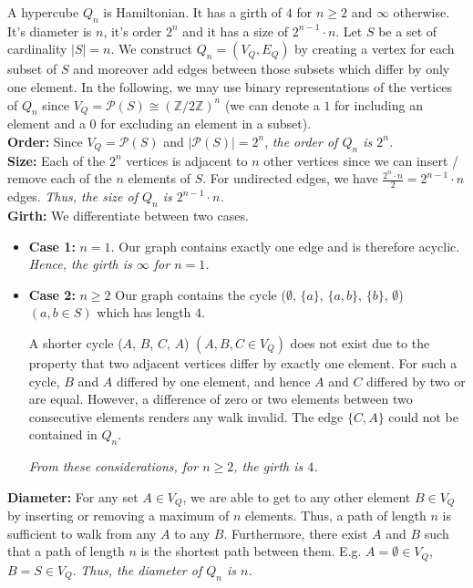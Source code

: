 \documentclass[a4paper]{article}
\begin{document}
	\begin{solution}{9}
		\begin{theorem}{A hypercube $Q_n$ is Hamiltonian. It has a girth of $4$ for $n \geq 2$ and $\infty$ otherwise. It's diameter is $n$, it's order $2^n$ and it has a size of $2^{n-1} \cdot n$.}
			Let $S$ be a set of cardinality $|S| = n$. We construct $Q_n = (V_Q, E_Q)$ by creating a vertex for each subset of $S$ and moreover add edges between those subsets which differ by only one element. In the following, we may use binary representations of the vertices of $Q_n$ since $V_Q = \mathcal{P}(S) \cong (\mathbb{Z}/2\mathbb{Z})^n$ (we can denote a $1$ for including an element and a $0$ for excluding an element in a subset).\\

			\textbf{Order:} Since $V_Q = \mathcal{P}(S)$ and $|\mathcal{P}(S)| = 2^n$, \emph{the order of $Q_n$ is $2^n$.}\\

			\textbf{Size:} Each of the $2^n$ vertices is adjacent to $n$ other vertices since we can insert / remove each of the $n$ elements of $S$. For undirected edges, we have $\frac{2^n \cdot n}{2} = 2^{n-1} \cdot n$ edges. \emph{Thus, the size of $Q_n$ is $2^{n-1} \cdot n$.}\\

			\textbf{Girth:} We differentiate between two cases.
				\begin{itemize}
					\item \textbf{Case 1: } $n=1$. Our graph contains exactly one edge and is therefore acyclic. \emph{Hence, the girth is $\infty$ for $n=1$.}

					\item \textbf{Case 2: } $n\geq2$ Our graph contains the cycle ($\emptyset$, $\{a\}$, $\{a,b\}$, $\{b\}$, $\emptyset$) $(a,b \in S)$ which has length $4$.

						A shorter cycle ($A$, $B$, $C$, $A$) $(A, B, C \in V_Q)$ does not exist due to the property that two adjacent vertices differ by exactly one element. For such a cycle, $B$ and $A$ differed by one element, and hence $A$ and $C$ differed by two or are equal. However, a difference of zero or two elements between two consecutive elements renders any walk invalid. The edge $\{C, A\}$ could not be contained in $Q_n$.
 
						\emph{From these considerations, for $n \geq 2$, the girth is $4$.}
				\end{itemize}

			\textbf{Diameter:}
				For any set $A \in V_Q$, we are able to get to any other element $B \in V_Q$ by inserting or removing a maximum of $n$ elements. Thus, a path of length $n$ is sufficient to walk from any $A$ to any $B$. Furthermore, there exist $A$ and $B$ such that a path of length $n$ is the shortest path between them. E.g. $A = \emptyset \in V_Q$, $B = S \in V_Q$. \emph{Thus, the diameter of $Q_n$ is $n$.}\\


\end{theorem}
\end{solution}
\end{document}
